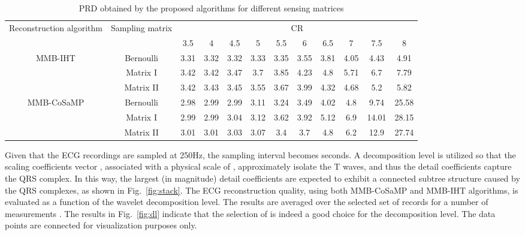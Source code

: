 \documentclass[journal]{IEEEtran}
\begin{document}
\begin{table*}[t]
\footnotesize
\renewcommand{\arraystretch}{1.3}
\caption{PRD obtained by the proposed algorithms for different sensing matrices}
\label{table_example}
\centering
\begin{tabular*}{0.8\textwidth}{@{\extracolsep\fill}c|c|cccccccccc}
\hline
\multirow{2}{1.5cm}{Reconstruction algorithm}&\multirow{2}{1.5cm}{Sampling matrix}&\multicolumn{10}{c}{CR}\\
\cline{3-12}
&&3.5&4&4.5&5&5.5&6&6.5&7&7.5&8\\
\hline
\multirow{3}{1.5cm}{MMB-IHT}& Bernoulli  &3.31&3.32&3.32&3.33&3.35&3.55&3.81&4.05&4.43&4.91\\
&Matrix I &  3.42&3.42&3.47&3.7&3.85&4.23&4.8& 5.71&6.7&7.79\\
&Matrix II & 3.42&3.43&3.45&3.55&3.67&3.99&4.32&4.68&5.2 & 5.82\\
\hline
\multirow{3}{1.5cm}{MMB-CoSaMP}&Bernoulli & 2.98&2.99&2.99&3.11&3.24&3.49&4.02&4.8&9.74&25.58\\
&Matrix I &  2.99&2.99&3.04&3.12&3.62&3.92&5.12&6.9&14.01&28.15\\
&Matrix II & 3.01&3.01&3.03&3.07&3.4&3.7&4.8&6.2& 12.9&27.74\\
\hline
\end{tabular*}
\end{table*}

Given that the ECG recordings are sampled at 250Hz, the sampling interval becomes  seconds. A decomposition level  is utilized so that the scaling coefficients vector , associated with a physical scale of , approximately isolate the T waves, and thus the detail coefficients capture the QRS complex. In this way, the largest (in magnitude) detail coefficients are expected to exhibit a connected subtree structure caused by the QRS complexes, as shown in Fig.~\ref{fig:stack}. The ECG reconstruction quality, using both MMB-CoSaMP and MMB-IHT algorithms, is evaluated as a function of the wavelet decomposition level. The results are averaged over the selected set of records for a number of measurements . The results in Fig.~\ref{fig:dl} indicate that the selection of  is indeed a good choice for the decomposition level. The data points are connected for visualization purposes only.
\end{document}

